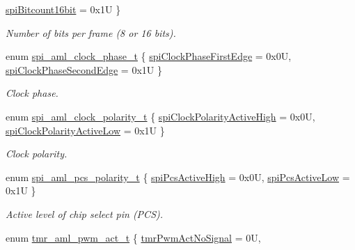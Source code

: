 \begin{DoxyCompactItemize}
\mbox{\hyperlink{group__enum__group_ggaf2c0a2911c01ceb543ef11a8f6334764a5c2d0efdb0a6d7b3742acc5e0c7b3146}{spi\+Bitcount16bit}} = 0x1U
 \}
\begin{DoxyCompactList}\small\item\em Number of bits per frame (8 or 16 bits). \end{DoxyCompactList}\item 
enum \mbox{\hyperlink{group__enum__group_gaa95bcc4aa184cc2df42df55e6d8c2d3a}{spi\+\_\+aml\+\_\+clock\+\_\+phase\+\_\+t}} \{ \mbox{\hyperlink{group__enum__group_ggaa95bcc4aa184cc2df42df55e6d8c2d3aaec1cd61e1e61c864a36166105525dd86}{spi\+Clock\+Phase\+First\+Edge}} = 0x0U, 
\mbox{\hyperlink{group__enum__group_ggaa95bcc4aa184cc2df42df55e6d8c2d3aaf4fa237620d516ad44263d9573441a6c}{spi\+Clock\+Phase\+Second\+Edge}} = 0x1U
 \}
\begin{DoxyCompactList}\small\item\em Clock phase. \end{DoxyCompactList}\item 
enum \mbox{\hyperlink{group__enum__group_ga846bf859b73b0a584889013e680bdc5f}{spi\+\_\+aml\+\_\+clock\+\_\+polarity\+\_\+t}} \{ \mbox{\hyperlink{group__enum__group_gga846bf859b73b0a584889013e680bdc5fa2d992758dc7e1f13b28bf2dbe0feec80}{spi\+Clock\+Polarity\+Active\+High}} = 0x0U, 
\mbox{\hyperlink{group__enum__group_gga846bf859b73b0a584889013e680bdc5fae4f4430c6e748f6c30c8d26d160fb358}{spi\+Clock\+Polarity\+Active\+Low}} = 0x1U
 \}
\begin{DoxyCompactList}\small\item\em Clock polarity. \end{DoxyCompactList}\item 
enum \mbox{\hyperlink{group__enum__group_ga376ab165389ceb9a6e3f763263ff7e06}{spi\+\_\+aml\+\_\+pcs\+\_\+polarity\+\_\+t}} \{ \mbox{\hyperlink{group__enum__group_gga376ab165389ceb9a6e3f763263ff7e06aeacea8171fe36165febd7a9d7f38beb8}{spi\+Pcs\+Active\+High}} = 0x0U, 
\mbox{\hyperlink{group__enum__group_gga376ab165389ceb9a6e3f763263ff7e06ab02bf7ebed3eb20339afa9d14aa81155}{spi\+Pcs\+Active\+Low}} = 0x1U
 \}
\begin{DoxyCompactList}\small\item\em Active level of chip select pin (P\+CS). \end{DoxyCompactList}\item 
enum \mbox{\hyperlink{group__enum__group_ga6ce2dec1c04ab59872ebaf44bd4f4682}{tmr\+\_\+aml\+\_\+pwm\+\_\+act\+\_\+t}} \{ \mbox{\hyperlink{group__enum__group_gga6ce2dec1c04ab59872ebaf44bd4f4682ab65ff56dc34163aa7481bc542c25643e}{tmr\+Pwm\+Act\+No\+Signal}} = 0U, 

\end{DoxyCompactItemize}
